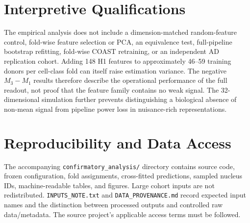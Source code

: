 \documentclass[9pt]{article}
\begin{document}
\section{Interpretive Qualifications}
The empirical analysis does not include a dimension-matched random-feature control, fold-wise feature selection or PCA, an equivalence test, full-pipeline bootstrap refitting, fold-wise COAST retraining, or an independent AD replication cohort. Adding 148 H1 features to approximately 46--59 training donors per cell-class fold can itself raise estimation variance. The negative $M_3-M_1$ results therefore describe the operational performance of the full readout, not proof that the feature family contains no weak signal. The 32-dimensional simulation further prevents distinguishing a biological absence of non-mean signal from pipeline power loss in nuisance-rich representations.

\section{Reproducibility and Data Access}
The accompanying \texttt{confirmatory\_analysis/} directory contains source code, frozen configuration, fold assignments, cross-fitted predictions, sampled nucleus IDs, machine-readable tables, and figures. Large cohort inputs are not redistributed. \texttt{INPUTS\_NOTE.txt} and \texttt{DATA\_PROVENANCE.md} record expected input names and the distinction between processed outputs and controlled raw data/metadata. The source project's applicable access terms must be followed.
\end{document}

